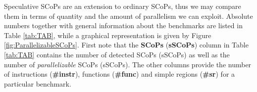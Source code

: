 
Speculative SCoPs are an extension to ordinary SCoPs, thus we may compare them 
in terms of quantity and the amount of parallelism we can exploit. 
Absolute numbers together with general  
information about the benchmarks are listed in Table 
\ref{tab:TAB}, while a graphical representation is given by Figure \ref{fig:ParallelizableSCoPs}. 
First note that the \textbf{SCoPs} (\textbf{sSCoPs}) column in Table \ref{tab:TAB} contains the 
number of detected SCoPs (sSCoPs) as well as the number of \textit{parallelizable} SCoPs 
(sSCoPs). The other columns provide the number of instructions 
(\textbf{\#instr}), functions (\textbf{\#func}) and simple regions (\textbf{\#sr})
for a particular benchmark.  \\


